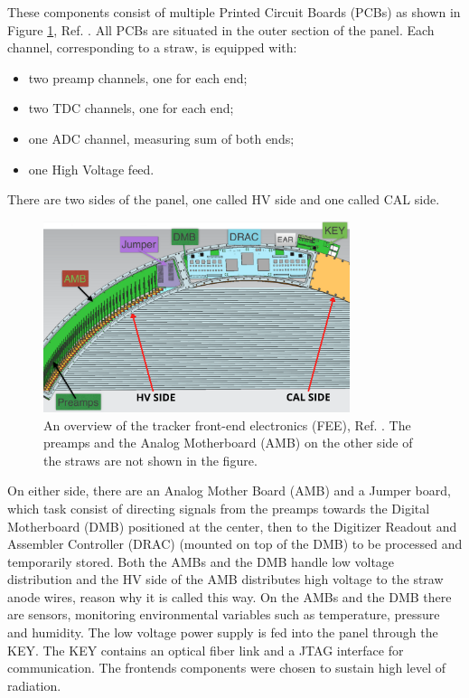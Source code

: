 These components consist of multiple Printed Circuit Boards (PCBs) as shown in Figure \ref{fig:trackerfee}, Ref. \cite{vadimmu2e}.
All PCBs are situated in the outer section of the panel. Each channel, corresponding to a straw, is equipped with:
\begin{itemize}
    \item two preamp channels, one for each end;
    \item two TDC channels, one for each end;
    \item one ADC channel, measuring sum of both ends;
    \item one High Voltage feed.
\end{itemize}
There are two sides of the panel, one called HV side and one called CAL side. 
\begin{figure}[!h]
\centering
\includegraphics[width =0.8\textwidth]{figures/png/Screenshot_20240131_111836.png}
\caption{An overview of the tracker front-end electronics (FEE), Ref.  
\cite{vadimmu2e}. The preamps and the Analog Motherboard (AMB) 
on the other side of the straws are not shown in the figure.}
\label{fig:trackerfee}
\end{figure}
On either side, there are an Analog Mother Board (AMB) and a Jumper board, 
which task consist of directing signals from the preamps towards the Digital 
Motherboard (DMB) positioned at the center, then to the Digitizer Readout and 
Assembler Controller (DRAC) (mounted on top of the DMB) to be processed and 
temporarily stored. Both the AMBs and the DMB handle low voltage distribution 
and the HV side of the AMB distributes high voltage to the straw anode wires, 
reason why it is called this way. On the AMBs and the DMB there are sensors, 
monitoring environmental variables such as temperature, pressure and humidity. 
The low voltage power supply is fed into the panel through the KEY. The KEY 
contains an optical fiber link and a JTAG interface for communication. The 
frontends components were chosen to sustain high level of radiation.
